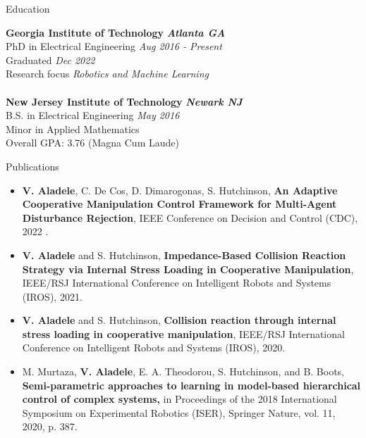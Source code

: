 \documentclass{resume} %
\begin{document}

\begin{rSection}{Education}

{\bf Georgia Institute of Technology} \hfill {\bf \em Atlanta GA} \\ 
PhD in Electrical Engineering \hfill {\em Aug 2016 - Present}\\
Graduated \hfill {\em Dec 2022}\\
Research focus \hfill {\em Robotics and Machine Learning}\\
\\
{\bf New Jersey Institute of Technology} \hfill {\bf \em Newark NJ} \\ 
B.S. in Electrical Engineering \hfill {\em May 2016}\\
Minor in Applied Mathematics \\
Overall GPA: 3.76 (Magna Cum Laude)

\end{rSection}

\begin{rSection}{Publications}
\begin{itemize}

\item \textbf{V. Aladele}, C. De Cos, D. Dimarogonas, S. Hutchinson, \textbf{An Adaptive Cooperative Manipulation Control Framework for Multi-Agent Disturbance Rejection}, IEEE Conference on Decision and Control (CDC), 2022 .

\item \textbf{V. Aladele} and S. Hutchinson, \textbf{Impedance-Based Collision Reaction Strategy via Internal Stress Loading in Cooperative Manipulation}, IEEE/RSJ International Conference on Intelligent Robots and Systems (IROS), 2021.

\item \textbf{V. Aladele} and S. Hutchinson, \textbf{Collision reaction through internal stress loading in cooperative manipulation}, IEEE/RSJ International Conference on Intelligent Robots and Systems (IROS), 2020.

\item M. Murtaza, \textbf{V. Aladele}, E. A. Theodorou, S. Hutchinson, and B. Boots, \textbf{Semi-parametric approaches to learning in model-based hierarchical control of complex
systems,} in Proceedings of the 2018 International Symposium on Experimental
Robotics (ISER), Springer Nature, vol. 11, 2020, p. 387.
\end{itemize}
\end{rSection}
\end{document}
